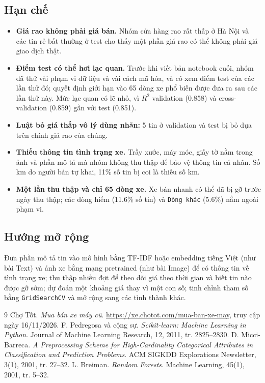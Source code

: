 \subsection*{Hạn chế}
\begin{itemize}
  \item \textbf{Giá rao không phải giá bán.} Nhóm cửa hàng rao rất thấp ở Hà Nội và các tin rẻ bất thường ở test cho
        thấy một phần giá rao có thể không phải giá giao dịch thật.
  \item \textbf{Điểm test có thể hơi lạc quan.} Trước khi viết bản notebook cuối, nhóm đã thử vài phạm vi dữ liệu và vài
        cách mã hóa, và có xem điểm test của các lần thử đó; quyết định giới hạn vào 65 dòng xe phổ biến được đưa ra sau
        các lần thử này. Mức lạc quan có lẽ nhỏ, vì $R^2$ validation (0.858) và cross-validation (0.859) gần với test
        (0.851).
  \item \textbf{Luật bỏ giá thấp vô lý dùng nhãn:} 5 tin ở validation và test bị bỏ dựa trên chính giá rao của chúng.
  \item \textbf{Thiếu thông tin tình trạng xe.} Trầy xước, máy móc, giấy tờ nằm trong ảnh và phần mô tả mà nhóm không thu
        thập để bảo vệ thông tin cá nhân. Số km do người bán tự khai, 11\% số tin bị coi là thiếu số km.
  \item \textbf{Một lần thu thập và chỉ 65 dòng xe.} Xe bán nhanh có thể đã bị gỡ trước ngày thu thập; các dòng hiếm
        (11.6\% số tin) và \texttt{Dòng khác} (5.6\%) nằm ngoài phạm vi.
\end{itemize}

\subsection*{Hướng mở rộng}
Đưa phần mô tả tin vào mô hình bằng TF-IDF hoặc embedding tiếng Việt (như bài Text) và ảnh xe bằng mạng pretrained (như
bài Image) để có thông tin về tình trạng xe; thu thập nhiều đợt để theo dõi giá theo thời gian và biết tin nào được gỡ
sớm; dự đoán một khoảng giá thay vì một con số; tinh chỉnh tham số bằng \texttt{GridSearchCV} và mở rộng sang các tỉnh
thành khác.

\begin{thebibliography}{9}
 Chợ Tốt. \textit{Mua bán xe máy cũ}. \url{https://xe.chotot.com/mua-ban-xe-may}, truy cập ngày
  16/11/2026.
 F. Pedregosa và cộng sự. \textit{Scikit-learn: Machine Learning in Python}. Journal of Machine
  Learning Research, 12, 2011, tr. 2825--2830.
 D. Micci-Barreca. \textit{A Preprocessing Scheme for High-Cardinality Categorical Attributes in
  Classification and Prediction Problems}. ACM SIGKDD Explorations Newsletter, 3(1), 2001, tr. 27--32.
 L. Breiman. \textit{Random Forests}. Machine Learning, 45(1), 2001, tr. 5--32.
\end{thebibliography}

